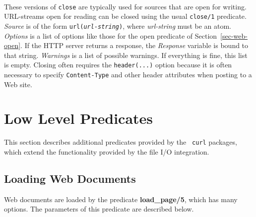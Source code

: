 \begin{description}

  \\
These versions of \texttt{close} are typically used for sources that
are open for writing. URL-streams open for reading can be closed using the
usual \texttt{close/1} predicate. 
{\it Source} is of the form {\tt url({\it {url-string}})},
where \emph{url-string} must be an atom. {\it Options} is a list
of options like those for the open predicate of Section~\ref{sec-web-open}.
If the HTTP server returns a response, the \emph{Response} variable is
bound to that string. \emph{Warnings} is a list of possible warnings. If
everything is fine, this list is empty.  
Closing often requires the \texttt{header(...)} option because it
is often necessary to specify \texttt{Content-Type} and other header
attributes when posting to a Web site. 

\end{description}


\section{Low Level Predicates}

This section describes additional predicates provided by the {\tt
  curl} packages, which extend the functionality provided by the file I/O
integration.

\subsection{Loading Web Documents}

Web documents are loaded by the predicate {\bf load\_page/5}, which has
many options. The parameters of this predicate are described below.


